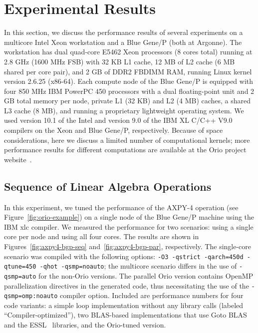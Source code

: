 \section{Experimental Results} 
\label{sec:results} 

In this section, we discuss the performance results of several experiments on
a multicore Intel Xeon workstation and a Blue Gene/P (both at Argonne). The
workstation has dual quad-core E5462 Xeon processors (8 cores total) running
at 2.8 GHz (1600 MHz FSB) with 32 KB L1 cache, 12 MB of L2 cache (6 MB shared
per core pair), and 2 GB of DDR2 FBDIMM RAM, running Linux kernel version
2.6.25 (x86-64). Each compute node of the Blue Gene/P is equipped with four
850 MHz IBM PowerPC 450 processors with a dual floating-point unit and 2 GB
total memory per node, private L1 (32 KB) and L2 (4 MB) caches, a shared L3
cache (8 MB), and running a proprietary lightweight operating system. We used
version 10.1 of the Intel and version 9.0 of the IBM XL C/C++ V9.0 compilers
on the Xeon and Blue Gene/P, respectively. Because of space considerations,
here we discuss a limited number of computational kernels; more performance
results for different computations are available at the Orio project
website~\cite{OrioURL}.

\subsection{Sequence of Linear Algebra Operations} 
\label{sec:axpy4-results}
 
In this experiment, we tuned the performance of the AXPY-4 operation (see
Figure~\ref{fig:orio-example}) on a single node of the Blue Gene/P machine
using the IBM xlc compiler.  We measured the performance for two scenarios:
using a single core per node and using all four cores. The results are shown
in Figures~\ref{fig:axpy4-bgp-seq} and~\ref{fig:axpy4-bgp-par},
respectively. The single-core scenario was compiled with the following options:
\texttt{-O3 -qstrict -qarch=450d -qtune=450 -qhot -qsmp=noauto};  the
multicore scenario differs in the use of \texttt{-qsmp=auto} for the non-Orio
versions. The parallel Orio version contains OpenMP parallelization
directives in the generated code, thus necessitating the use of the
\texttt{-qsmp=omp:noauto} compiler option. Included are performance numbers for four
code variants: a simple loop implementation without any library calls
(labeled ``Compiler-optimized''), two BLAS-based implementations that use
Goto BLAS~\cite{Goto:2006fk} and the ESSL~\cite{ESSL} libraries, and the
Orio-tuned version.

